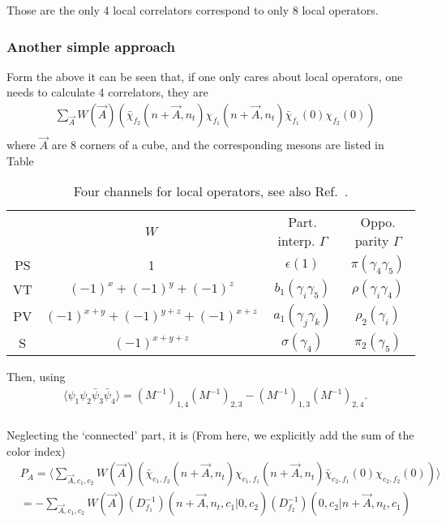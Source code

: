 Those are the only 4 local correlators correspond to only 8 local operators.

\subsubsection{\label{AnotherSimpleApproach}Another simple approach}

Form the above it can be seen that, if one only cares about local operators, one needs to calculate 4 correlators, they are
\begin{equation}
\begin{split}
&\sum _{\vec{A}}W(\vec{A})\left(\bar{\chi}_{f_2}(n+\vec{A},n_t) \chi_{f_1}(n+\vec{A},n_t) \bar{\chi}_{f_1}(0) \chi_{f_2}(0)\right)\\
\end{split}
\end{equation}
where $\vec{A}$ are $8$ corners of a cube, and the corresponding mesons are listed in Table~\cite{tab:staggeredMeson3}
\begin{table}
\begin{center}
\begin{tabular}{cccc}
\hline
 & $W$ & Part. interp. $\Gamma$ & Oppo. parity $\Gamma$ \\
PS & 1 & $\epsilon (1)$ & $\pi (\gamma _4\gamma _5)$ \\
VT & $(-1)^x+(-1)^y+(-1)^z$ & $b_1 (\gamma _i \gamma _5)$ & $\rho(\gamma _i \gamma _4)$\\
PV & $(-1)^{x+y}+(-1)^{y+z}+(-1)^{x+z}$ & $a_1 (\gamma _j\gamma _k)$ & $\rho_2 (\gamma _i)$ \\
S & $(-1)^{x+y+z}$ & $\sigma (\gamma _4)$ & $\pi _2 (\gamma _5)$ \\
\hline
\end{tabular}
\end{center}
\caption{\label{tab:staggeredMeson3}Four channels for local operators, see also Ref.~\cite{Gottlieb:1988gr}.}
\end{table} 

Then, using
\begin{equation}
\begin{split}
&\langle \psi _1\psi_2 \bar{\psi} _3 \bar{\psi}_4\rangle = \left(M^{-1}\right)_{1,4}\left(M^{-1}\right)_{2,3}- \left(M^{-1}\right)_{1,3}\left(M^{-1}\right)_{2,4}.\\
\end{split}
\end{equation}

Neglecting the `connected' part, it is (From here, we explicitly add the sum of the color index)
\begin{equation}
\begin{split}
&P_A=\langle \sum _{\vec{A},c_1,c_2}W(\vec{A})\left(\bar{\chi}_{c_1,f_2}(n+\vec{A},n_t) \chi_{c_1,f_1}(n+\vec{A},n_t) \bar{\chi}_{c_2,f_1}(0) \chi_{c_2,f_2}(0)\right) \rangle\\
&=-\sum _{\vec{A},c_1,c_2}W(\vec{A}) \left(D_{f_1}^{-1}\right)\left(n+\vec{A},n_t,c_1|0,c_2\right)\left(D_{f_2}^{-1}\right)\left(0,c_2|n+\vec{A},n_t,c_1\right)\\
\end{split}
\end{equation}

